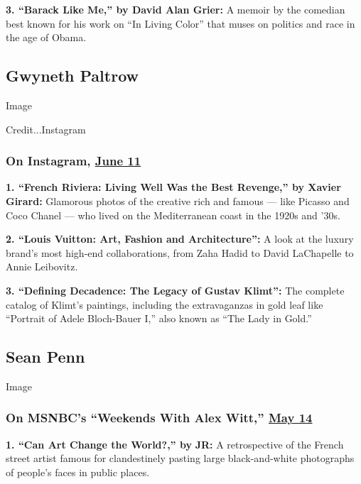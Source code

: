 \textbf{3. ``Barack Like Me,'' by David Alan Grier:} A memoir by the
comedian best known for his work on ``In Living Color'' that muses on
politics and race in the age of Obama.

\hypertarget{gwyneth-paltrow}{%
\subsection{Gwyneth Paltrow}\label{gwyneth-paltrow}}

Image

Credit...Instagram

\hypertarget{on-instagram-june-11}{%
\subsubsection{\texorpdfstring{On Instagram,
\href{https://www.instagram.com/p/CBT8cIZD-Jp/}{June
11}}{On Instagram, June 11}}\label{on-instagram-june-11}}

\textbf{1. ``French Riviera: Living Well Was the Best Revenge,'' by
Xavier Girard:} Glamorous photos of the creative rich and famous ---
like Picasso and Coco Chanel --- who lived on the Mediterranean coast in
the 1920s and '30s.

\textbf{2. ``Louis Vuitton: Art, Fashion and Architecture'':} A look at
the luxury brand's most high-end collaborations, from Zaha Hadid to
David LaChapelle to Annie Leibovitz.

\textbf{3. ``Defining Decadence: The Legacy of Gustav Klimt'':} The
complete catalog of Klimt's paintings, including the extravaganzas in
gold leaf like ``Portrait of Adele Bloch-Bauer I,'' also known as ``The
Lady in Gold.''

\hypertarget{sean-penn}{%
\subsection{Sean Penn}\label{sean-penn}}

Image

\hypertarget{on-msnbcs-weekends-with-alex-witt-may-14}{%
\subsubsection{\texorpdfstring{On MSNBC's ``Weekends With Alex Witt,''
\href{https://www.youtube.com/watch?v=XGe2cuOlkNA}{May
14}}{On MSNBC's ``Weekends With Alex Witt,'' May 14}}\label{on-msnbcs-weekends-with-alex-witt-may-14}}

\textbf{1. ``Can Art Change the World?,'' by} \textbf{JR:} A
retrospective of the French street artist famous for clandestinely
pasting large black-and-white photographs of people's faces in public
places.

